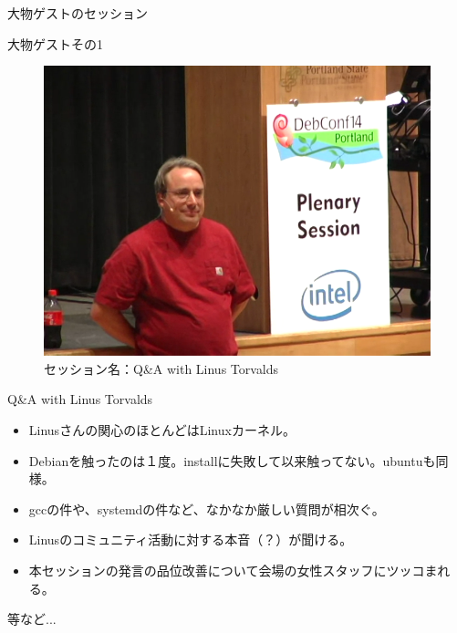 \begin{frame}{大物ゲストのセッション}


\end{frame}

\begin{frame}{大物ゲストその1}

\begin{figure}[H]
\begin{center}
 \includegraphics[width=0.7\hsize]{image201409/qa_linus.png}
\end{center}
\caption{セッション名：Q\&A with Linus Torvalds}
\end{figure}


\end{frame}

\begin{frame}{Q\&A with Linus Torvalds}

 \begin{itemize}
   \item Linusさんの関心のほとんどはLinuxカーネル。
   \item Debianを触ったのは１度。installに失敗して以来触ってない。ubuntuも同様。
   \item gccの件や、systemdの件など、なかなか厳しい質問が相次ぐ。
   \item Linusのコミュニティ活動に対する本音（？）が聞ける。
   \item 本セッションの発言の品位改善について会場の女性スタッフにツッコまれる。
 \end{itemize}
等など...

\end{frame}

